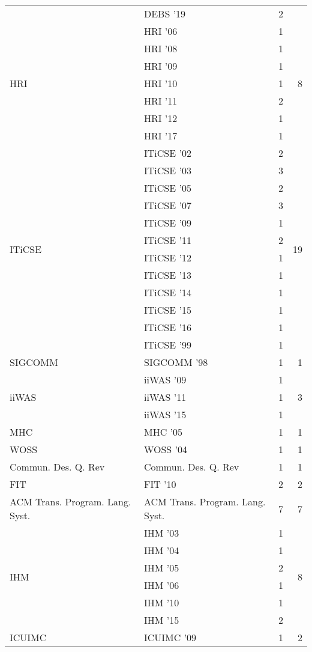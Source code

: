 \begin{table*}[t]
\begin{tabular}{llrr}
& DEBS '19 & 2 &\\
\multirow{7}{*}{HRI } & HRI '06 & 1 & \multirow{7}{*}{8}\\
& HRI '08 & 1 &\\
& HRI '09 & 1 &\\
& HRI '10 & 1 &\\
& HRI '11 & 2 &\\
& HRI '12 & 1 &\\
& HRI '17 & 1 &\\
\multirow{12}{*}{ITiCSE } & ITiCSE '02 & 2 & \multirow{12}{*}{19}\\
& ITiCSE '03 & 3 &\\
& ITiCSE '05 & 2 &\\
& ITiCSE '07 & 3 &\\
& ITiCSE '09 & 1 &\\
& ITiCSE '11 & 2 &\\
& ITiCSE '12 & 1 &\\
& ITiCSE '13 & 1 &\\
& ITiCSE '14 & 1 &\\
& ITiCSE '15 & 1 &\\
& ITiCSE '16 & 1 &\\
& ITiCSE '99 & 1 &\\
\multirow{1}{*}{SIGCOMM } & SIGCOMM '98 & 1 & \multirow{1}{*}{1}\\
\multirow{3}{*}{iiWAS } & iiWAS '09 & 1 & \multirow{3}{*}{3}\\
& iiWAS '11 & 1 &\\
& iiWAS '15 & 1 &\\
\multirow{1}{*}{MHC } & MHC '05 & 1 & \multirow{1}{*}{1}\\
\multirow{1}{*}{WOSS } & WOSS '04 & 1 & \multirow{1}{*}{1}\\
\multirow{1}{*}{Commun. Des. Q. Rev} & Commun. Des. Q. Rev & 1 & \multirow{1}{*}{1}\\
\multirow{1}{*}{FIT } & FIT '10 & 2 & \multirow{1}{*}{2}\\
\multirow{1}{*}{ACM Trans. Program. Lang. Syst.} & ACM Trans. Program. Lang. Syst. & 7 & \multirow{1}{*}{7}\\
\multirow{6}{*}{IHM } & IHM '03 & 1 & \multirow{6}{*}{8}\\
& IHM '04 & 1 &\\
& IHM '05 & 2 &\\
& IHM '06 & 1 &\\
& IHM '10 & 1 &\\
& IHM '15 & 2 &\\
\multirow{2}{*}{ICUIMC } & ICUIMC '09 & 1 & \multirow{2}{*}{2}\\

\end{tabular}
\end{table*}
